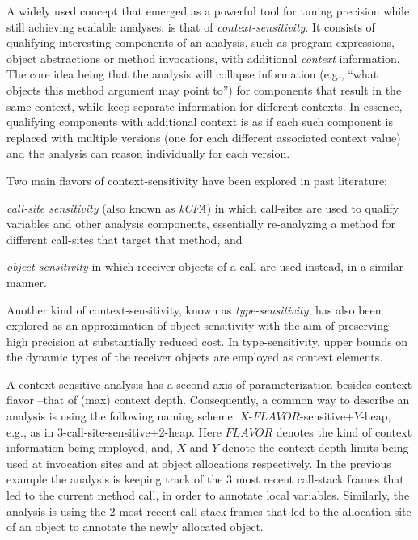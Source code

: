A widely used concept that emerged as a powerful tool for tuning precision while still achieving scalable analyses, is that of \emph{context-sensitivity}. It consists of qualifying interesting components of an analysis, such as program expressions, object abstractions or method invocations, with additional \emph{context} information. The core idea being that the analysis will collapse information (e.g., ``what objects this method argument may point to'') for components that result in the same context, while keep separate information for different contexts. In essence, qualifying components with additional context is as if each such component is replaced with multiple versions (one for each different associated context value) and the analysis can reason individually for each version.

Two main flavors of context-sensitivity have been explored in past literature: \begin{inparaenum}[(1)]
\item \emph{call-site sensitivity} (also known as \emph{kCFA}) in which call-sites are used to qualify variables and other analysis components, essentially re-analyzing a method for different call-sites that target that method, and
\item \emph{object-sensitivity} in which receiver objects of a call are used instead, in a similar manner.
\end{inparaenum}
Another kind of context-sensitivity, known as \emph{type-sensitivity}, has also been explored as an approximation of object-sensitivity with the aim of preserving high precision at substantially reduced cost. In type-sensitivity, upper bounds on the dynamic types of the receiver objects are employed as context elements. 

A context-sensitive analysis has a second axis of parameterization besides context flavor --that of (max) context depth. Consequently, a common way to describe an analysis is using the following naming scheme: $X$-$FLAVOR$-sensitive+$Y$-heap, e.g., as in 3-call-site-sensitive+2-heap. Here $FLAVOR$ denotes the kind of context information being employed, and, $X$ and $Y$ denote the context depth limits being used at invocation sites and at object allocations respectively. In the previous example the analysis is keeping track of the 3 most recent call-stack frames that led to the current method call, in order to annotate local variables. Similarly, the analysis is using the 2 most recent call-stack frames that led to the allocation site of an object to annotate the newly allocated object.


